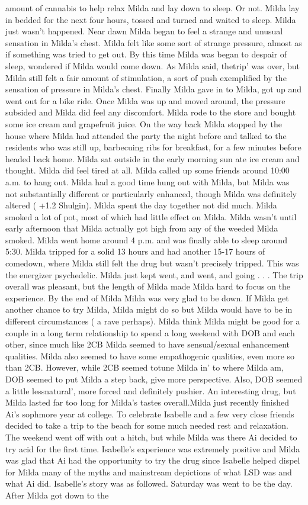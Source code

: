 \documentclass[12pt]{book}
\begin{document}
amount of cannabis to help relax Milda and lay down to sleep. Or not. Milda lay in bedded for the next four hours, tossed and turned and waited to sleep. Milda just wasn't happened. Near dawn Milda began to feel a strange and unusual sensation in Milda's chest. Milda felt like some sort of strange pressure, almost as if something was tried to get out. By this time Milda was began to despair of sleep, wondered if Milda would come down. As Milda said, thetrip' was over, but Milda still felt a fair amount of stimulation, a sort of push exemplified by the sensation of pressure in Milda's chest. Finally Milda gave in to Milda, got up and went out for a bike ride. Once Milda was up and moved around, the pressure subsided and Milda did feel any discomfort. Milda rode to the store and bought some ice cream and grapefruit juice. On the way back Milda stopped by the house where Milda had attended the party the night before and talked to the residents who was still up, barbecuing ribs for breakfast, for a few minutes before headed back home. Milda sat outside in the early morning sun ate ice cream and thought. Milda did feel tired at all. Milda called up some friends around 10:00 a.m. to hang out. Milda had a good time hung out with Milda, but Milda was not substantially different or particularly enhanced, though Milda was definitely altered ( +1.2 Shulgin). Milda spent the day together not did much. Milda smoked a lot of pot, most of which had little effect on Milda. Milda wasn't until early afternoon that Milda actually got high from any of the weeded Milda smoked. Milda went home around 4 p.m. and was finally able to sleep around 5:30. Milda tripped for a solid 13 hours and had another 15-17 hours of comedown, where Milda still felt the drug but wasn't precisely tripped. This was the energizer psychedelic. Milda just kept went, and went, and going . . .  The trip overall was pleasant, but the length of Milda made Milda hard to focus on the experience. By the end of Milda Milda was very glad to be down. If Milda get another chance to try Milda, Milda might do so but Milda would have to be in different circumstances ( a rave perhaps). Milda think Milda might be good for a couple in a long term relationship to spend a long weekend with DOB and each other, since much like 2CB Milda seemed to have sensual/sexual enhancement qualities. Milda also seemed to have some empathogenic qualities, even more so than 2CB. However, while 2CB seemed totune Milda in' to where Milda am, DOB seemed to put Milda a step back, give more perspective. Also, DOB seemed a little lessnatural', more forced and definitely pushier. An interesting drug, but Milda lasted far too long for Milda's tastes overall.Milda just recently finished Ai's sophmore year at college. To celebrate Isabelle and a few very close friends decided to take a trip to the beach for some much needed rest and relaxation. The weekend went off with out a hitch, but while Milda was there Ai decided to try acid for the first time. Isabelle's experience was extremely positive and Milda was glad that Ai had the opportunity to try the drug since Isabelle helped dispel for Milda many of the myths and mainstream depictions of what LSD was and what Ai did. Isabelle's story was as followed. Saturday was went to be the day. After Milda got down to the 
\end{document}
